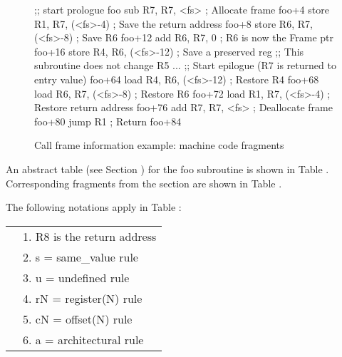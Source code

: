 \begin{figure}[ht]
\begin{nlnlisting}
       ;; start prologue
foo    sub   R7, R7, <fs>        ; Allocate frame
foo+4  store R1, R7, (<fs>-4)    ; Save the return address
foo+8  store R6, R7, (<fs>-8)    ; Save R6
foo+12 add   R6, R7, 0           ; R6 is now the Frame ptr
foo+16 store R4, R6, (<fs>-12)   ; Save a preserved reg
       ;; This subroutine does not change R5
       ...
       ;; Start epilogue (R7 is returned to entry value)
foo+64 load  R4, R6, (<fs>-12)   ; Restore R4
foo+68 load  R6, R7, (<fs>-8)    ; Restore R6
foo+72 load  R1, R7, (<fs>-4)    ; Restore return address
foo+76 add   R7, R7, <fs>        ; Deallocate frame
foo+80 jump  R1                  ; Return
foo+84
\end{nlnlisting}
\caption{Call frame information example: machine code fragments}
\label{fig:callframeinformationexamplemachinecodefragments}
\end{figure}


An abstract table 
(see Section ) 
for the foo subroutine is shown in 
Table .
Corresponding fragments from the
\dotdebugframe{} section are shown in 
Table .

The following notations apply in 
Table :
\par
\begin{nolinenumbersenv}
\begin{tabular}{p{5mm}l}
&1.  R8 is the return address \\
&2.  s = same\_value rule \\
&3.  u = undefined rule \\
&4.  rN = register(N) rule \\
&5.  cN = offset(N) rule \\
&6.  a = architectural rule \\
\end{tabular}
\end{nolinenumbersenv}

